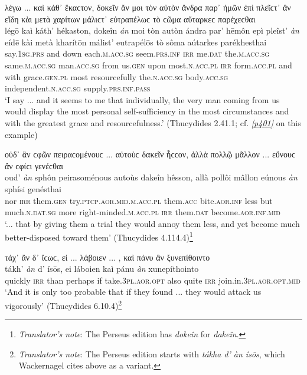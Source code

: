 \begin{exe}
\ex λέγω ... καὶ κάθ᾽ ἕκαϲτον, δοκεῖν ἄν μοι τὸν αὐτὸν ἄνδρα παρ᾽ ἡμῶν ἐπὶ πλεῖϲτ᾽ ἂν εἴδη κὰι μετὰ χαρίτων μάλιϲτ᾽ εὐτραπέλωϲ τὸ ϲῶμα αὔταρκεϲ παρέχεϲθαι\\
\gll légō kaì káth' hékaston, dokeîn \emph{án} moi tòn autòn ándra par' hēmôn epì pleîst' \emph{àn} eídē kài metà kharítōn málist' eutrapélōs tò sôma aútarkes parékhesthai\\
say.\textsc{1sg.prs} and down each.\textsc{m.acc.sg} seem.\textsc{prs.inf} \textsc{irr} me.\textsc{dat} the.\textsc{m.acc.sg} same.\textsc{m.acc.sg} man.\textsc{acc.sg} from us.\textsc{gen} upon most.\textsc{n.acc.pl} \textsc{irr} form.\textsc{acc.pl} and with grace.\textsc{gen.pl} most resourcefully the.\textsc{n.acc.sg} body.\textsc{acc.sg} independent.\textsc{n.acc.sg} supply.\textsc{prs.inf.pass}\\
\trans `I say ... and it seems to me that individually, the very man coming from us would display the most personal self-sufficiency in the most circumstances and with the greatest grace and resourcefulness.' (Thucydides 2.41.1; cf. \citealp[87]{PoppoStahl1889} \hyperlink{p401}{\emph{[p401]}} on this example)
\label{multian39}
\end{exe}

\begin{exe}
\ex οὐδ᾽ ἂν ϲφῶν πειραϲομένουϲ ... αὐτοὺϲ δακεῖν ἧϲϲον, ἀλλὰ πολλῷ μᾶλλον ... εὔνουϲ ἂν ϲφίϲι γενέϲθαι\\
\gll oud' \emph{àn} sphôn peirasoménous autoùs dakeîn hêsson, allà pollôi mâllon eúnous \emph{àn} sphísi genésthai\\
nor \textsc{irr} them.\textsc{gen} try.\textsc{ptcp.aor.mid.m.acc.pl} them.\textsc{acc} bite.\textsc{aor.inf} less but much.\textsc{n.dat.sg} more right-minded.\textsc{m.acc.pl} \textsc{irr} them.\textsc{dat} become.\textsc{aor.inf.mid}\\
\trans `... that by giving them a trial they would annoy them less, and yet become much better-disposed toward them' (Thucydides 4.114.4)\footnote{\emph{Translator's note}: The Perseus edition has \textit{dokeîn} for \textit{dakeîn}.}
\label{multian40}
\end{exe}

\begin{exe}
\ex τάχ᾽ ἂν δ᾽ ἴϲωϲ, εἰ ... λάβοιεν ... , καὶ πάνυ ἂν ξυνεπίθοιντο\\
\gll tákh' \emph{àn} d' ísōs, ei láboien kaì pánu \emph{àn} xunepíthointo\\
quickly \textsc{irr} than perhaps if take.\textsc{3pl.aor.opt} also quite \textsc{irr} join.in.\textsc{3pl.aor.opt.mid}\\
\trans `And it is only too probable that if they found ... they would attack us vigorously' (Thucydides 6.10.4)\footnote{\emph{Translator's note}: The Perseus edition starts with \textit{tákha d' àn ísōs}, which Wackernagel cites above as a variant.}
\label{multian41}
\end{exe}

